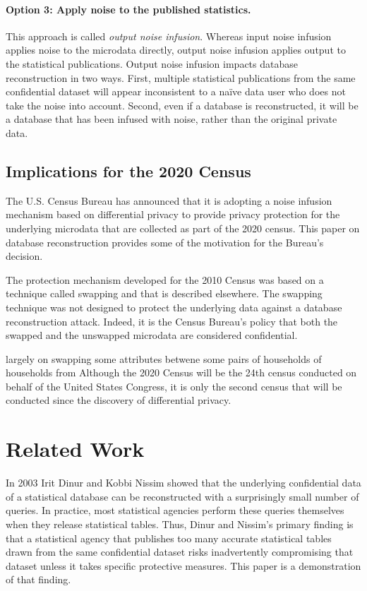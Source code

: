 \documentclass[runningheads]{llncs}
\begin{document}
\paragraph{Option 3: Apply noise to the published statistics.} This
approach is called \emph{output noise infusion}. Whereas input noise infusion
applies noise to the microdata directly, output noise infusion applies
output to the statistical publications.  Output noise infusion impacts
database reconstruction in two ways. First, multiple statistical
publications from the same confidential dataset will appear
inconsistent to a na\"ive data user who does not take the noise into
account. Second, even if a database is reconstructed, it will be a
database that has been infused with noise, rather than the original
private data. 


\subsection{Implications for the 2020 Census}

The U.S. Census Bureau has announced that it is adopting a noise
infusion mechanism based on differential privacy to provide privacy
protection for the underlying microdata that are collected as part of
the 2020 census. This paper on database reconstruction provides some
of the motivation for the Bureau's decision.

The protection mechanism developed for the 2010 Census was based
on a technique called swapping and that is described elsewhere\cite{swapping}. The swapping technique was not
designed to protect the underlying data against a database
reconstruction attack. Indeed, it is the Census Bureau's policy that
both the swapped and the unswapped microdata are considered
confidential.


largely on swapping some attributes betwene some pairs of households of households from Although the 2020 Census will be the 24th census conducted on behalf of the
United States Congress, it is only the second census that will be
conducted since the discovery of differential privacy.

\section{Related Work}

In 2003 Irit Dinur and Kobbi Nissim\cite{DinurNissim2003} showed that the underlying
confidential data of a statistical database can be reconstructed with
a surprisingly small number of queries. In practice, most statistical
agencies perform these queries themselves when they release
statistical tables. Thus, Dinur and Nissim's primary finding
is that a statistical agency that publishes too many accurate statistical
tables drawn from the same confidential dataset risks inadvertently
compromising that dataset unless it takes specific protective
measures. This paper is a demonstration of that finding.
\end{document}
